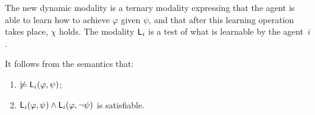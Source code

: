 The new dynamic modality is a ternary modality expressing that the agent is able to learn how to achieve $\varphi$ given $\psi$, and that after this learning operation takes place, $\chi$ holds.
The modality ${\sf L}_i$ is a test of what is learnable by the agent~$i$.


\medskip

\begin{proposition}\label{prop:nolearn}
It follows from the semantics that:
\begin{enumerate}
\item\label{itm:nolearnable} $\not\models{\sf L}_i(\varphi,\psi)$; %
\item\label{itm:learnboth} ${\sf L}_i(\varphi,\psi) \wedge {\sf L}_i(\varphi,\neg\psi)$ is satisfiable.
\end{enumerate}
\end{proposition}


